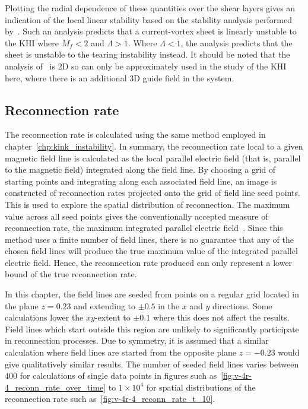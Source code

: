 Plotting the radial dependence of these quantities over the shear layers gives an indication of the local linear stability based on the stability analysis performed by~\cite{einaudiResistiveInstabilitiesFlowing1986}. Such an analysis predicts that a current-vortex sheet is linearly unstable to the KHI where $M_f < 2$ and $\Lambda > 1$. Where $\Lambda < 1$, the analysis predicts that the sheet is unstable to the tearing instability instead. It should be noted that the analysis of~\cite{einaudiResistiveInstabilitiesFlowing1986} is 2D so can only be approximately used in the study of the KHI here, where there is an additional 3D guide field in the system.

\subsection{Reconnection rate}

The reconnection rate is calculated using the same method employed in chapter~\ref{chp:kink_instability}. In summary, the reconnection rate local to a given magnetic field line is calculated as the local parallel electric field (that is, parallel to the magnetic field) integrated along the field line. By choosing a grid of starting points and integrating along each associated field line, an image is constructed of reconnection rates projected onto the grid of field line seed points. This is used to explore the spatial distribution of reconnection. The maximum value across all seed points gives the conventionally accepted measure of reconnection rate, the maximum integrated parallel electric field~\cite{galsgaardSteadyStateReconnection2011,priestNatureThreedimensionalMagnetic2003,schindlerGeneralMagneticReconnection1988}. Since this method uses a finite number of field lines, there is no guarantee that any of the chosen field lines will produce the true maximum value of the integrated parallel electric field. Hence, the reconnection rate produced can only represent a lower bound of the true reconnection rate.

In this chapter, the field lines are seeded from points on a regular grid located in the plane $z=0.23$ and extending to $\pm 0.5$ in the $x$ and $y$ directions. Some calculations lower the $xy$-extent to $\pm 0.1$ where this does not affect the results. Field lines which start outside this region are unlikely to significantly participate in reconnection processes. Due to symmetry, it is assumed that a similar calculation where field lines are started from the opposite plane $z = -0.23$ would give qualitatively similar results. The number of seeded field lines varies between $400$ for calculations of single data points in figures such as~\ref{fig:v-4r-4_reconn_rate_over_time} to $1\times 10^4$ for spatial distributions of the reconnection rate such as~\ref{fig:v-4r-4_reconn_rate_t_10}.

